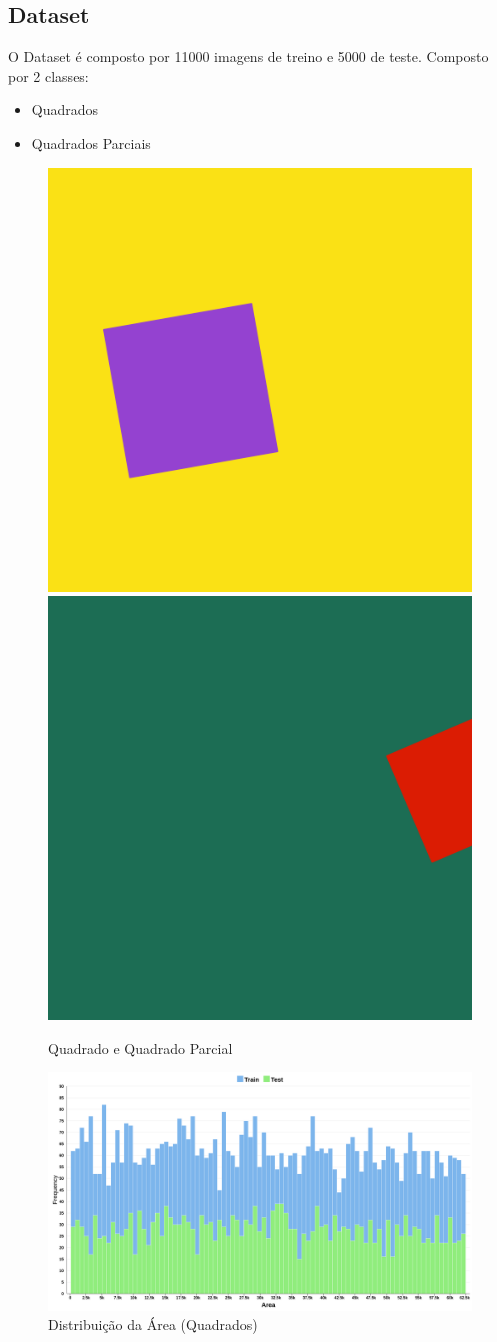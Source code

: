 \subsection{Dataset}
O Dataset é composto por 11000 imagens de treino e 5000 de teste. Composto por 2 classes: 
\begin{itemize}
    \item Quadrados 
    \item Quadrados Parciais
\end{itemize}
\begin{figure}[H]
    \centering
    \includegraphics[width=0.35\linewidth]{imgs/Test_5/5/dataset/square_5501.png}
    \includegraphics[width=0.35\linewidth]{imgs/Test_5/5/dataset/square_cut_5501.png}
    \caption{Quadrado e Quadrado Parcial}
    \label{fig:enter-label}
\end{figure}
\begin{figure}[H]
    \centering
    \includegraphics[width=1.0\linewidth]{imgs/Test_5/5/dataset/Squares_Area_Distribution_Hist.png}
    \caption{Distribuição da Área (Quadrados)}
    \label{fig:enter-label}
\end{figure}
